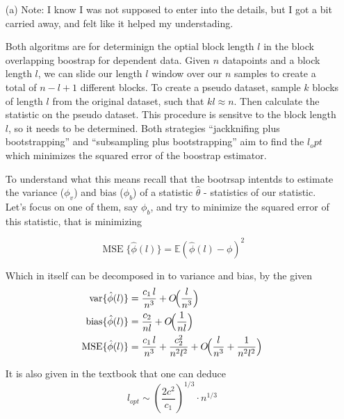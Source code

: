 \documentclass[a4paper,12pt]{article}
\theoremstyle{breaktheorem}
\theoremstyle{exerciseStyle}
\theoremstyle{solutionStyle}
\begin{document}
\begin{enumerate}
    \item [(a)]
          Note: I know I was not supposed to enter into the details, but I got a bit carried away, and felt like it helped
          my understading.

          Both algoritms are for determinign the optial block length $l$ in the block overlapping boostrap for dependent data.
          Given $n$ datapoints and a block length $l$, we can slide our length $l$ window over our $n$ samples to create
          a total of $n - l + 1$ different blocks.
          To create a pseudo dataset, sample $k$ blocks of length $l$ from the original dataset, such that
          $kl \approx n$. Then calculate the statistic on the pseudo dataset. This procedure is
          sensitve to the block length $l$, so it needs to be determined.
          Both strategies ``jackknifing plus bootstrapping'' and ``subsampling plus bootstrapping'' aim to
          find the $l_opt$ which minimizes the squared error of the boostrap estimator.

          To understand what this means recall that the bootrsap intentds
          to estimate the variance ($\phi_v$) and bias ($\phi_b$) of a statistic $\hat{\theta}$ - statistics of our statistic.
          Let's focus on one of them, say $\phi_b$, and try to minimize the squared error of this
          statistic, that is minimizing

          \begin{equation}
              \operatorname{MSE} \{ \hat \phi (l)\}  = \mathbb{E} \left( \hat \phi (l) - \phi \right)^2
              \label{eq:mse}
          \end{equation}

          Which in itself can be decomposed in to variance and bias, by the given
          \begin{align}
              \operatorname{var}\{\hat{\phi}(l)\}  & = \frac{c_1\, l}{n^3} + O\!\Bigl(\frac{l}{n^3}\Bigr)       \label{eq:var}                        \\
              \operatorname{bias}\{\hat{\phi}(l)\} & = \frac{c_2}{n l} + O\!\Bigl(\frac{1}{n l}\Bigr)            \label{eq:bias}                      \\
              \operatorname{MSE}\{\hat{\phi}(l)\}  & = \frac{c_1\, l}{n^3} + \frac{c_2^2}{n^2 l^2} + O\!\Bigl(\frac{l}{n^3} + \frac{1}{n^2 l^2}\Bigr)
          \end{align}

          It is also given in the textbook that one can deduce
          \begin{equation}
              l_{opt} \sim \left( \frac{2c^2}{c_1} \right)^{1/3} \cdot n^{1/3}
              \label{eq:lopt}
          \end{equation}


\end{enumerate}
\end{document}

